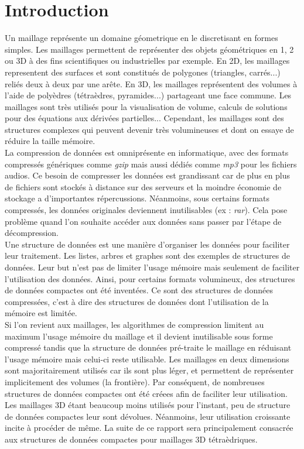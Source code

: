\documentclass[a4paper,11pt,openany]{article}
\begin{document}
\section{Introduction}
\noindent
Un maillage représente un domaine géometrique en le discretisant en formes simples. Les maillages permettent de représenter des objets géométriques en 1, 2 ou 3D à des fins scientifiques ou industrielles par exemple. En 2D, les maillages representent des surfaces et sont constitués de polygones (triangles, carrés...) reliés deux à deux par une arête. En 3D, les maillages représentent des volumes à l'aide de polyèdres (tétraèdres, pyramides...) partageant une face commune. Les maillages sont très utilisés pour la visualisation de volume, calculs de solutions pour des équations aux dérivées partielles... Cependant, les maillages sont des structures complexes qui peuvent devenir très volumineuses et dont on essaye de réduire la taille mémoire.\\
La compression de données est omniprésente en informatique, avec des formats compressés génériques comme \textit{gzip} mais aussi dédiés comme \textit{mp3} pour les fichiers audios. Ce besoin de compresser les données est grandissant car de plus en plus de fichiers sont stockés à distance sur des serveurs et la moindre économie de stockage a d'importantes répercussions. Néanmoins, sous certains formats compressés, les données originales deviennent inutilisables (ex : \textit{rar}). Cela pose problème quand l'on souhaite accéder aux données  sans passer par l'étape de décompression.\\
Une structure de données est une manière d'organiser les données pour faciliter leur traitement. Les listes, arbres et graphes sont des exemples de structures de données. Leur but n'est pas de limiter l'usage mémoire mais seulement de faciliter l'utilisation des données. Ainsi, pour certains formats volumineux, des structures de données compactes ont été inventées. Ce sont des structures de données compressées, c'est à dire des structures de données dont l'utilisation de la mémoire est limitée.\\
Si l'on revient aux maillages, les algorithmes de compression limitent au maximum l'usage mémoire du maillage et il devient inutilisable sous forme compressé tandis que la structure de données pré-traite le maillage en réduisant l'usage mémoire mais celui-ci reste utilisable. Les maillages en deux dimensions sont majoritairement utilisés car ils sont plus léger, et permettent de représenter implicitement des volumes (la frontière). Par conséquent, de nombreuses structures de données compactes ont été créees afin de faciliter leur utilisation. Les maillages 3D étant beaucoup moins utilisés pour l'instant, peu de structure de données compactes leur sont dévolues. Néanmoins, leur utilisation croissante incite à procéder de même. La suite de ce rapport sera principalement consacrée aux structures de données compactes pour maillages 3D tétraèdriques.\\\\
\end{document}

